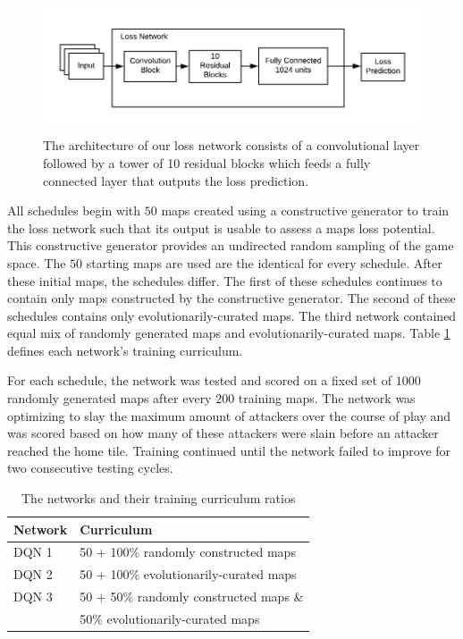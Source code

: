 \documentclass[letterpaper]{article} %
\begin{document}
\begin{figure}[tb]
\begin{center}
\includegraphics[width=0.7200000000000001\linewidth,height=1.56in ]{graphics/loss-network.png}
\caption{The architecture of our loss network consists of a convolutional layer followed by a tower of 10 residual blocks which feeds a fully connected layer that outputs the loss prediction.}
\label{fig:loss-network-diagram}
\end{center}
\end{figure}

All schedules begin with $50$ maps created using a constructive generator to train the loss network such that its output is usable to assess a maps loss potential. This constructive generator provides an undirected random sampling of the game space. The $50$ starting maps are used are the identical for every schedule. After these initial maps, the schedules differ. The first of these schedules continues to contain only maps constructed by the constructive generator. The second of these schedules contains only evolutionarily-curated maps. The third network contained equal mix of randomly generated maps and evolutionarily-curated maps. Table \ref{table:networks} defines each network's training curriculum.

For each schedule, the network was tested and scored on a fixed set of $1000$ randomly generated maps after every $200$ training maps. The network was optimizing to slay the maximum amount of attackers over the course of play and was scored based on how many of these attackers were slain before an attacker reached the home tile. Training continued until the network failed to improve for two consecutive testing cycles.

\begin{table}[]
\begin{tabular}{|l|l|}
\hline
\textbf{Network} & \textbf{Curriculum} \\ \hline
DQN 1  & 50 + 100\% randomly constructed maps\\ \hline
DQN 2  & 50 + 100\% evolutionarily-curated maps\\ \hline
DQN 3  & 50 + 50\% randomly constructed maps \& \\
& 50\% evolutionarily-curated maps\\ \hline
\end{tabular}
\caption{The networks and their training curriculum ratios}
\label{table:networks}
\end{table}
\end{document}
